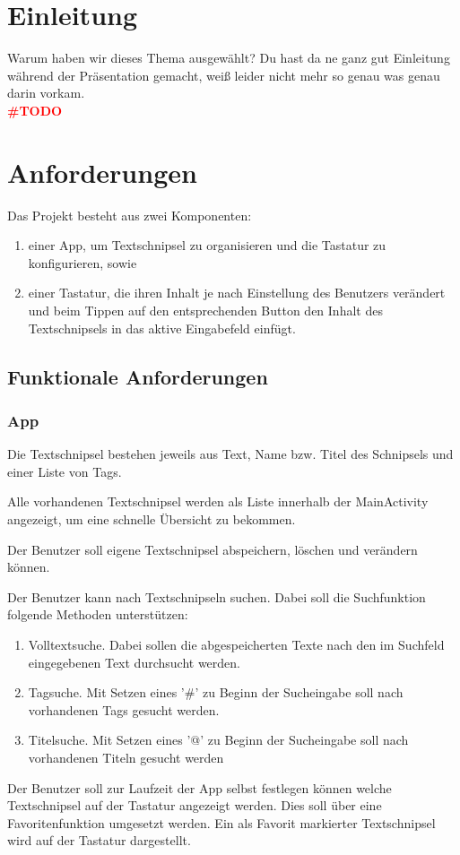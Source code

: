 \documentclass[11pt]{article}
\begin{document}
\section{Einleitung}
	Warum haben wir dieses Thema ausgewählt? Du hast da ne ganz gut Einleitung während der Präsentation gemacht, weiß leider nicht mehr so genau was genau darin vorkam.\\
	\textcolor{red}{\textbf{{\LARGE \#TODO}}}
	

\section{Anforderungen}
	Das Projekt besteht aus zwei Komponenten:
	\begin{enumerate}
		\item einer App, um Textschnipsel zu organisieren und die Tastatur zu konfigurieren, sowie
		\item einer Tastatur, die ihren Inhalt je nach Einstellung des Benutzers verändert und beim Tippen auf den entsprechenden Button den Inhalt des Textschnipsels in das aktive Eingabefeld einfügt.
	\end{enumerate}
	\subsection{Funktionale Anforderungen}
		\subsubsection{App}
		\begin{FA}
			\item \label{fa:1} Die Textschnipsel bestehen jeweils aus Text, Name bzw. Titel des Schnipsels und einer Liste von Tags.
			\item \label{fa:2} Alle vorhandenen Textschnipsel werden als Liste innerhalb der MainActivity angezeigt, um eine schnelle Übersicht zu bekommen.
			\item \label{fa:3} Der Benutzer soll eigene Textschnipsel abspeichern, löschen und verändern können.
			\item \label{fa:4} Der Benutzer kann nach Textschnipseln suchen. Dabei soll die Suchfunktion folgende Methoden unterstützen:
				\begin{enumerate}
					\item Volltextsuche. Dabei sollen die abgespeicherten Texte nach den im Suchfeld eingegebenen Text durchsucht werden.
					\item Tagsuche. Mit Setzen eines '\#' zu Beginn der Sucheingabe soll nach vorhandenen Tags gesucht werden.
					\item Titelsuche. Mit Setzen eines '@' zu Beginn der Sucheingabe soll nach vorhandenen Titeln gesucht werden
				\end{enumerate}
			\item \label{fa:5} Der Benutzer soll zur Laufzeit der App selbst festlegen können welche Textschnipsel auf der Tastatur angezeigt werden. Dies soll über eine Favoritenfunktion umgesetzt werden. Ein als Favorit markierter Textschnipsel wird auf der Tastatur dargestellt.
		\end{FA}
		
\end{document}
